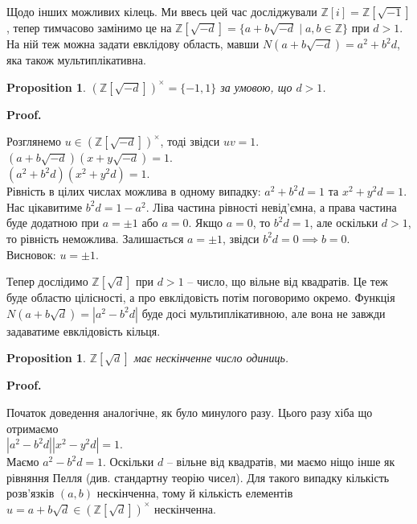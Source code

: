 \documentclass[a4paper, 10pt]{article}
\makeatletter
\theoremstyle{theoremdd}
\theoremstyle{theoremdd}
\theoremstyle{theoremdd}
\theoremstyle{theoremdd}
\theoremstyle{theoremdd}
\theoremstyle{theoremdd}
\theoremstyle{theoremdd}
\theoremstyle{theoremdd}
\theoremstyle{theoremdd}
\newtheorem{proposition}[theorem]{Proposition}
\theoremstyle{theoremdd}
\theoremstyle{theoremdd}
\theoremstyle{theoremdd}
\theoremstyle{theoremdd}
\theoremstyle{theoremdd}
\theoremstyle{theoremdd}
\renewenvironment{proof}[1][Proof.\\]{\par
\pushQED{\hfill \qed}%
\normalfont \topsep6\p@\@plus6\p@\relax
\trivlist
\item\relax
{\bfseries
#1\@addpunct{.}}\hspace\labelsep\ignorespaces
}{%
\popQED\endtrivlist\@endpefalse
}
\makeatother
\begin{document}
Щодо інших можливих кілець. Ми ввесь цей час досліджували $\mathbb{Z}[i] = \mathbb{Z}[\sqrt{-1}]$, тепер тимчасово замінимо це на $\mathbb{Z}[\sqrt{-d}] = \{a + b \sqrt{-d} \mid a,b \in \mathbb{Z}\}$ при $d > 1$.\\
На ній теж можна задати евклідову область, мавши $N(a + b\sqrt{-d}) = a^2 + b^2d$, яка також мультиплікативна.

\begin{proposition}
$(\mathbb{Z}[\sqrt{-d}])^\times = \{-1,1\}$ за умовою, що $d > 1$.
\end{proposition}

\begin{proof}
Розглянемо $u \in (\mathbb{Z}[\sqrt{-d}])^\times$, тоді звідси $uv = 1$.\\
$(a + b \sqrt{-d}) (x + y \sqrt{-d}) = 1$.\\
$(a^2 + b^2 d)(x^2 + y^2d) = 1$.\\
Рівність в цілих числах можлива в одному випадку: $a^2 + b^2 d = 1$ та $x^2 + y^2 d = 1$. Нас цікавитиме $b^2 d = 1 - a^2$. Ліва частина рівності невід'ємна, а права частина буде додатною при $a = \pm 1$ або $a = 0$. Якщо $a = 0$, то $b^2 d = 1$, але оскільки $d > 1$, то рівність неможлива. Залишається $a = \pm 1$, звідси $b^2 d = 0 \implies b = 0$.\\
Висновок: $u = \pm 1$.
\end{proof}

Тепер дослідимо $\mathbb{Z}[\sqrt{d}]$ при $d> 1$ -- число, що вільне від квадратів. Це теж буде областю цілісності, а про евклідовість потім поговоримо окремо. Функція $N(a + b\sqrt{d}) = |a^2 - b^2d|$ буде досі мультиплікативною, але вона не завжди задаватиме евклідовість кільця.

\begin{proposition}
$\mathbb{Z}[\sqrt{d}]$ має нескінченне число одиниць.
\end{proposition}

\begin{proof}
Початок доведення аналогічне, як було минулого разу. Цього разу хіба що отримаємо\\
$|a^2 - b^2d| |x^2 - y^2d| = 1$.\\
Маємо $a^2 - b^2d = 1$. Оскільки $d$ -- вільне від квадратів, ми маємо ніщо інше як рівняння Пелля (див. стандартну теорію чисел). Для такого випадку кількість розв'язків $(a,b)$ нескінченна, тому й кількість елементів $u = a + b \sqrt{d} \in (\mathbb{Z}[\sqrt{d}])^\times$ нескінченна.
\end{proof}
\end{document}
